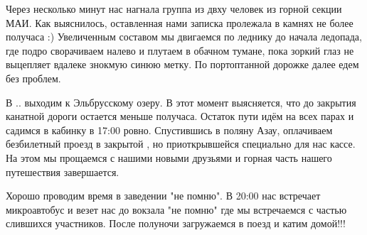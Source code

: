 Через несколько минут нас нагнала группа из двху человек из горной секции МАИ. Как выяснилось, оставленная нами записка пролежала в камнях не более получаса :) Увеличенным составом мы двигаемся по леднику до начала ледопада, где подро сворачиваем налево и плутаем в обачном тумане, пока зоркий глаз не выцепляет вдалеке знокмую синюю метку. По портоптанной дорожке далее едем без проблем. 

В .. выходим к Эльбрусскому озеру. В этот момент выясняется, что до закрытия канатной дороги остается меньше получаса. Остаток пути идём на всех парах и садимся в кабинку в 17:00 ровно. Спустившись в поляну Азау, оплачиваем безбилетный проезд в закрытой , но приоткрывшейся специально для нас кассе. На этом мы прощаемся с нашими новыми друзьями и горная часть нашего путешествия завершается.

Хорошо проводим время в заведении "не помню". В 20:00 нас встречает микроавтобус и везет нас до вокзала "не помню" где мы встречаемся с частью слившихся участников. После полуночи загружаемся в поезд и катим домой!!!







\newpage